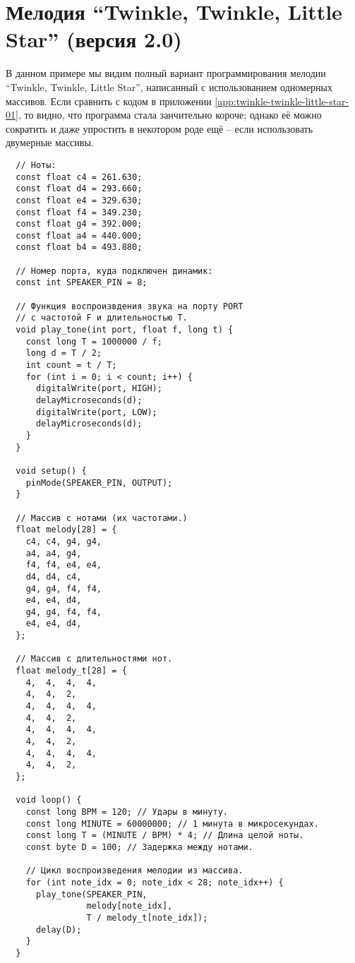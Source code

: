 \documentclass[../sparc.tex]{subfiles}
\begin{document}
\newpage
\chapter{Мелодия ``Twinkle, Twinkle, Little Star'' (версия 2.0)}
\label{app:twinkle-twinkle-little-star-02}

В данном примере мы видим полный вариант программирования мелодии ``Twinkle,
Twinkle, Little Star'', написанный с использованием одномерных массивов.  Если
сравнить с кодом в приложении \ref{app:twinkle-twinkle-little-star-01}, то
видно, что программа стала занчительно короче; однако её можно сократить и даже
упростить в некотором роде ещё -- если использовать двумерные массивы.

\begin{verbatim}
  // Ноты:
  const float c4 = 261.630;
  const float d4 = 293.660;
  const float e4 = 329.630;
  const float f4 = 349.230;
  const float g4 = 392.000;
  const float a4 = 440.000;
  const float b4 = 493.880;

  // Номер порта, куда подключен динамик:
  const int SPEAKER_PIN = 8;

  // Функция воспроизвдения звука на порту PORT
  // с частотой F и длительностью T.
  void play_tone(int port, float f, long t) {
    const long T = 1000000 / f;
    long d = T / 2;
    int count = t / T;
    for (int i = 0; i < count; i++) {
      digitalWrite(port, HIGH);
      delayMicroseconds(d);
      digitalWrite(port, LOW);
      delayMicroseconds(d);
    }
  }

  void setup() {
    pinMode(SPEAKER_PIN, OUTPUT);
  }

  // Массив с нотами (их частотами.)
  float melody[28] = {
    c4, c4, g4, g4,
    a4, a4, g4,
    f4, f4, e4, e4,
    d4, d4, c4,
    g4, g4, f4, f4,
    e4, e4, d4,
    g4, g4, f4, f4,
    e4, e4, d4,
  };

  // Массив с длительностями нот.
  float melody_t[28] = {
    4,  4,  4,  4,
    4,  4,  2,
    4,  4,  4,  4,
    4,  4,  2,
    4,  4,  4,  4,
    4,  4,  2,
    4,  4,  4,  4,
    4,  4,  2,
  };

  void loop() {
    const long BPM = 120; // Удары в минуту.
    const long MINUTE = 60000000; // 1 минута в микросекундах.
    const long T = (MINUTE / BPM) * 4; // Длина целой ноты.
    const byte D = 100; // Задержка между нотами.

    // Цикл воспроизведения мелодии из массива.
    for (int note_idx = 0; note_idx < 28; note_idx++) {
      play_tone(SPEAKER_PIN,
                melody[note_idx],
                T / melody_t[note_idx]);
      delay(D);
    }
  }
\end{verbatim}
\end{document}

